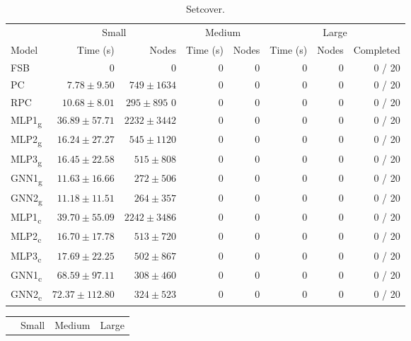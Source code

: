   
\begin{scriptsize}
\begin{table}[ht]
	\centering
	\begin{tabular}{lrrrrrrr}
		\toprule
		& \multicolumn{2}{c}{Small} & \multicolumn{2}{c}{Medium} & \multicolumn{3}{c}{Large}\\ \cmidrule(lr){2-3} \cmidrule(lr){4-5} \cmidrule(lr){6-8}
		Model & Time (s) & Nodes  & Time (s) & Nodes & Time (s) & Nodes & Completed\\
		\midrule
		FSB & 0 & 0 & 0 & 0 & 0 & 0 & 0 / 20\\
		PC  & $7.78 \pm 9.50$ & $749 \pm 1634$ & 0 & 0 & 0 & 0 & 0 / 20\\
		RPC & $10.68 \pm 8.01$ & $295 \pm 895$ 0 & 0 & 0 & 0 & 0 & 0 / 20\\
		\addlinespace
		MLP1\textsubscript{g} & $36.89 \pm 57.71$ & $2232 \pm 3442$ & 0 & 0 & 0 & 0 & 0 / 20\\
		MLP2\textsubscript{g} & $16.24 \pm 27.27$ & $545 \pm 1120$ & 0 & 0 & 0 & 0 & 0 / 20\\
		MLP3\textsubscript{g} & $16.45 \pm 22.58$ & $515 \pm 808 $& 0 & 0 & 0 & 0 & 0 / 20\\
		GNN1\textsubscript{g} & $11.63 \pm 16.66$ & $272 \pm 506 $& 0 & 0 & 0 & 0 & 0 / 20\\
		GNN2\textsubscript{g} & $11.18 \pm 11.51$ & $264 \pm 357 $& 0 & 0 & 0 & 0 & 0 / 20\\
		\addlinespace
		MLP1\textsubscript{c} & $39.70 \pm 55.09$ & $2242 \pm 3486$ & 0 & 0 & 0 & 0 & 0 / 20\\
		MLP2\textsubscript{c} & $16.70 \pm 17.78$ & $513 \pm 720$ & 0 & 0 & 0 & 0 & 0 / 20\\
		MLP3\textsubscript{c} & $17.69 \pm 22.25$ & $502 \pm 867$ & 0 & 0 & 0 & 0 & 0 / 20\\
		GNN1\textsubscript{c} & $68.59 \pm 97.11$ & $308 \pm 460$ & 0 & 0 & 0 & 0 & 0 / 20\\
		GNN2\textsubscript{c} & $72.37 \pm 112.80$ & $324 \pm 523$ & 0 & 0 & 0 & 0 & 0 / 20\\
		\bottomrule
	\end{tabular}
	\caption{Setcover.}\label{tab:results1_set}
\end{table}
\begin{table}[ht]
	\centering
	\begin{tabular}{lrrrrrrr}
	    \toprule
		& \multicolumn{2}{c}{Small} & \multicolumn{2}{c}{Medium} & \multicolumn{3}{c}{Large}\\ \cmidrule(lr){2-3} \cmidrule(lr){4-5} \cmidrule(lr){6-8}

\end{tabular}
\end{table}
\end{scriptsize}
